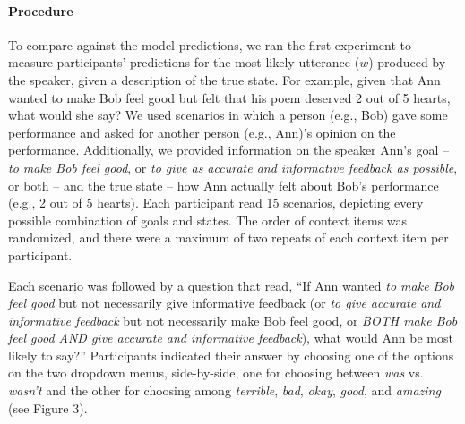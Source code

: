 \paragraph{Procedure}

To compare against the model predictions, we ran the first experiment to measure participants'
predictions for the most likely utterance (\(w\)) produced by the
speaker, given a description of the true state. For example, given that
Ann wanted to make Bob feel good but felt that his poem deserved 2 out
of 5 hearts, what would she say? 
We used scenarios in which a
person (e.g., Bob) gave some performance and asked for another person
(e.g., Ann)'s opinion on the performance. Additionally, we provided
information on the speaker Ann's goal -- \emph{to make Bob feel good},
or \emph{to give as accurate and informative feedback as possible}, or
both -- and the true state -- how Ann actually felt about Bob's
performance (e.g., 2 out of 5 hearts). Each participant read 15
scenarios, depicting every possible combination of goals and states. The
order of context items was randomized, and there were a maximum of two
repeats of each context item per participant.

Each scenario was followed by a question that read, ``If Ann wanted
\emph{to make Bob feel good} but not necessarily give informative
feedback (or \emph{to give accurate and informative feedback} but not
necessarily make Bob feel good, or \emph{BOTH make Bob feel good AND
give accurate and informative feedback}), what would Ann be most likely
to say?'' Participants indicated their answer by choosing one of the
options on the two dropdown menus, side-by-side, one for choosing
between \emph{was} vs. \emph{wasn't} and the other for choosing among
\emph{terrible}, \emph{bad}, \emph{okay}, \emph{good}, and
\emph{amazing} (see Figure 3).

